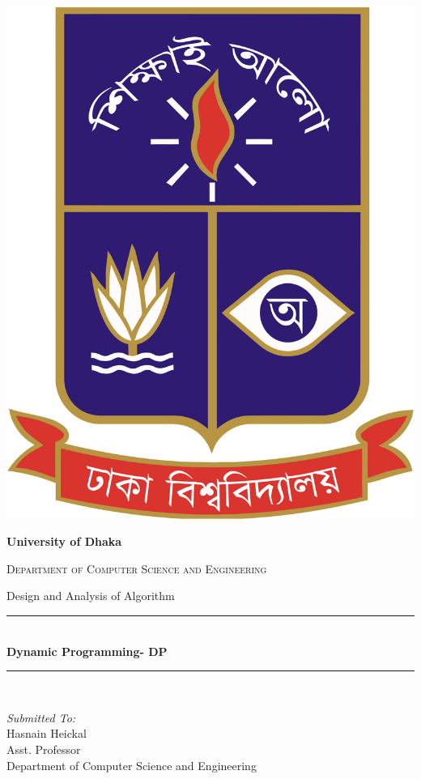 \documentclass[12pt]{article}
\begin{document}
\begin{titlepage}
\centering
\vspace{10mm}
\includegraphics[scale = 0.1]{logo.png}\\[1.5 cm]	%
\begin{center}\textbf{\LARGE University of Dhaka}\end{center}
\textsc{\Large Department of Computer Science and Engineering}\\[0.5 cm]
\begin{center} Design and Analysis of Algorithm \end{center}	%
	\rule{\linewidth}{0.2 mm} \\[0.4 cm]
	{ \huge \bfseries{Dynamic Programming- DP}}\\
	\rule{\linewidth}{0.2 mm} \\[1.5 cm]
	
	\begin{minipage}{0.4\textwidth}
		\begin{flushleft} \large
			\emph{Submitted To:}\\
			\vspace{6mm}
			Hasnain Heickal\\
           		 Asst. Professor\\
           		 Department of Computer Science and Engineering\\
			\end{flushleft}
			\end{minipage}~
			\begin{minipage}{0.4\textwidth}
            

\end{minipage}
\end{titlepage}
\end{document}
